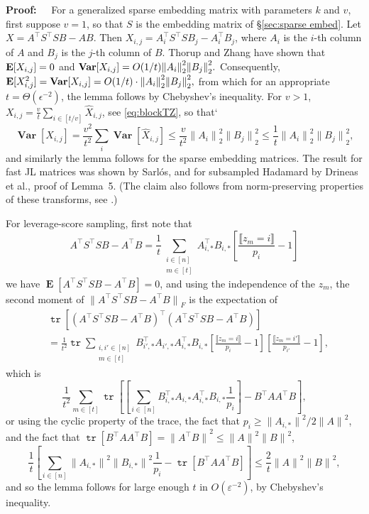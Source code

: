 \documentclass{sig-alternate}
\newcommand{\normF}[1]{{\| #1 \|}_F}
\newcommand{\norm}[1]{{\| #1 \|}}
\DeclareMathOperator{\tr}{\mathtt{tr}}
\DeclareMathOperator{\E}{\mathbf{E}}
\DeclareMathOperator{\Var}{\mathbf{Var}}
\newcommand{\ZZ}{S}
\newcommand{\Ibr}[1]{\llbracket#1\rrbracket}
\newcommand{\eps}{\varepsilon}
\def\FullBox{\hbox{\vrule width 8pt height 8pt depth 0pt}}
\def\qed{\ifmmode\qquad\FullBox\else{\unskip\nobreak\hfil
\penalty50\hskip1em\null\nobreak\hfil\FullBox
\parfillskip=0pt\finalhyphendemerits=0\endgraf}\fi}
\newenvironment{proof}{\begin{trivlist} \item {\bf Proof:~~}}
  {\qed\end{trivlist}}
\begin{document}
\ifSTOC\else
\begin{proof}
For a generalized sparse embedding
matrix with parameters $k$ and $v$, first suppose $v=1$,
so that $\ZZ $ is the embedding matrix of \S\ref{sec:sparse embed}.
Let $X = A^\top  \ZZ ^\top  \ZZ  B - AB$. Then $X_{i,j} = A_i^\top  \ZZ ^\top  \ZZ  B_j  - A_i^\top B_j$, where $A_i$ is the $i$-th column of $A$
and $B_j$ is the $j$-th column of $B$. Thorup and Zhang \cite{tz04} have shown that ${\bf E}[X_{i,j}] = 0$ 
and ${\bf Var}[X_{i,j}] = O(1/t) \norm{A_i}_2^2 \norm{B_j}_2^2.$ Consequently, 
${\bf E}[X_{i,j}^2] = {\bf Var}[X_{i,j}] = O(1/t) \cdot \norm{A_i}_2^2 \norm{B_j}_2^2,$ from which
for an appropriate $t = \Theta(\epsilon^{-2})$, the lemma follows by Chebyshev's inequality.
For $v>1$, $X_{i,j} = \frac{v}{t}\sum_{i\in [t/v]} \hat X_{i,j}$,
see \eqref{eq:blockTZ},
so that`
\[
\Var[X_{i,j}]
	= \frac{v^2}{t^2}\sum_i \Var[\hat X_{i,j}]
	\le \frac{v}{t^2}\norm{A_i}_2^2 \norm{B_j}_2^2
	\le \frac{1}{t}\norm{A_i}_2^2 \norm{B_j}_2^2,
\]
and similarly the lemma follows for the sparse embedding matrices.
The result for fast JL matrices was shown by Sarl{\'o}s\cite{s06},
and for subsampled Hadamard by Drineas et al.\cite{dmms11}, proof of Lemma~5.
(The claim also follows from norm-preserving properties of these
transforms, see \cite{kn10}.)

For leverage-score sampling, first note that
\[
A^\top \ZZ ^\top \ZZ B - A^\top B
	= \frac{1}{t} \sum_{\substack{i\in [n]\\m\in[t]}} A_{i,*}^\top B_{i,*} \left[\frac{\Ibr{z_m=i}}{p_i} - 1\right]
\]
we have $\E[A^\top \ZZ ^\top \ZZ B - A^\top B] = 0$,
and using the independence of the $z_m$,
the second moment of $\normF{A^\top \ZZ ^\top \ZZ B - A^\top B}$
is the expectation of
\begin{align*}
& \tr[ ( A^\top \ZZ ^\top \ZZ B - A^\top B)^\top (A^\top \ZZ ^\top \ZZ B - A^\top B)]
	\\ & = \frac{1}{t^2}\tr \sum_{\substack{i,i'\in [n]\\m\in[t]}}
		B_{i',*}^\top A_{i',*}A_{i,*}^\top B_{i,*}
			\left[\frac{\Ibr{z_m=i}}{p_i} - 1\right]\left[\frac{\Ibr{z_m=i'}}{p_{i'}} - 1\right],
\end{align*}
which is
\[
\frac{1}{t^2} \sum_{m\in [t]}
	\tr\left[ \left[\sum_{i\in [n]} B_{i,*}^\top A_{i,*}A_{i,*}^\top B_{i,*}\frac{1}{p_i}\right]
		- B^\top A A^\top B\right],
\]
or using the cyclic property of the trace, the fact that $p_i \ge \norm{A_{i,*}}^2/2\norm{A}^2$, and
the fact that $\tr[B^\top A A^\top B] = \norm{A^\top B}^2 \le \norm{A}^2\norm{B}^2$,
\[
\frac{1}{t} 
	\left[\sum_{i\in [n]} \norm{A_{i,*}}^2\norm{B_{i,*}}^2\frac{1}{p_i}
		- \tr[B^\top A A^\top B]\right]
	\le \frac{2}{t} \norm{A}^2\norm{B}^2,
\]
and so the lemma follows for large enough $t$ in $O(\eps^{-2})$,
by Chebyshev's inequality.
\end{proof}
\end{document}
